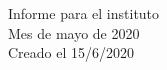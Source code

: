 \documentclass[12pt,a4paper]{article}
\begin{document}
	\begin{center}
		\huge Informe para el instituto  \\
		\vspace*{5pt}
		\LARGE Mes de mayo de 2020 \\
		\vspace*{0pt}
		\Large Creado el 15/6/2020
	\end{center}

	\vspace*{20pt}

	{
		\begin{spacing}{0.5}
		\tableofcontents
		\end{spacing}
	}
	\pagebreak

	
\end{document}
